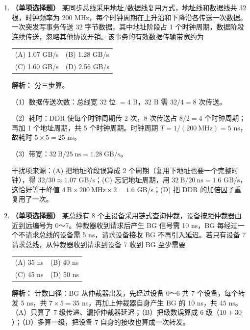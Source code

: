 \begin{enumerate}[resume]

\item \textbf{（单项选择题）} 某同步总线采用地址/数据线复用方式，地址线和数据线共 32 根，时钟频率为 200 MHz，每个时钟周期在上升沿和下降沿各传送一次数据。一次突发写事务传送 32 字节数据，其中地址阶段占 1 个时钟周期，数据阶段连续传送，忽略其他协议开销。该事务的有效数据传输带宽约为

\nopagebreak[4]
\begin{center}
\begin{tabular}{ll}
(A) 1.07 GB/s & (B) 1.28 GB/s \\[4pt]
(C) 1.60 GB/s & (D) 2.56 GB/s
\end{tabular}
\end{center}

\ifshowsolutions\par\noindent\textbf{解析：} 分三步算。

（1）数据传送次数：总线宽 32 位 $=4$ B，32 B 需 $32/4=8$ 次传送。

（2）耗时：DDR 使每个时钟周期传 2 次，8 次传送占 $8/2=4$ 个时钟周期；再加 1 个地址周期，共 5 个时钟周期。时钟周期 $T=1/(200\ \text{MHz})=5$ ns，故耗时 $5\times5=25$ ns。

（3）带宽：$32\ \text{B}/25\ \text{ns}=1.28\ \text{GB/s}$。

干扰项来源：(A) 把地址阶段误算成 2 个周期（复用下地址也要一个完整时钟），得 $32/30\approx1.07$ GB/s；(C) 忘记地址周期，用 $32\ \text{B}/20\ \text{ns}=1.6$ GB/s，这恰好等于峰值 $4\ \text{B}\times200\ \text{MHz}\times2=1.6$ GB/s；(D) 把 DDR 的加倍因子重复用了一次。\else \answerarea \fi

\item \textbf{（单项选择题）} 某总线有 8 个主设备采用链式查询仲裁，设备按距仲裁器由近到远编号为 0～7。仲裁器收到请求后产生 BG 信号需 10 ns，BG 每经过一个不请求总线的设备需 5 ns，请求设备接收 BG 不再引入延迟。若只有设备 7 请求总线，从仲裁器收到请求到设备 7 收到 BG 至少需要

\nopagebreak[4]
\begin{center}
\begin{tabular}{ll}
(A) 35 ns & (B) 40 ns \\[4pt]
(C) 45 ns & (D) 50 ns
\end{tabular}
\end{center}

\ifshowsolutions\par\noindent\textbf{解析：} 计数口径：BG 从仲裁器出发，先经过设备 0～6 共 7 个设备，每个转发 5 ns，共 $7\times5=35$ ns，再加上仲裁器自身产生 BG 的 10 ns，共 $45$ ns。（A）只算了 7 级传递、漏掉仲裁器延迟；（B）把级数误算成 6 级（$10+30$）；（D）多算一级，把设备 7 自身的接收也算成一次转发。\else \answerarea \fi


\end{enumerate}
